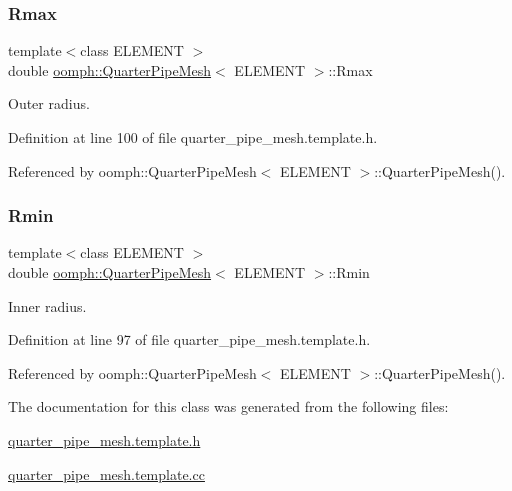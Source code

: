 \subsubsection{\texorpdfstring{Rmax}{Rmax}}
{\footnotesize\ttfamily template$<$class E\+L\+E\+M\+E\+NT $>$ \\
double \hyperlink{classoomph_1_1QuarterPipeMesh}{oomph\+::\+Quarter\+Pipe\+Mesh}$<$ E\+L\+E\+M\+E\+NT $>$\+::Rmax\hspace{0.3cm}{\ttfamily [protected]}}



Outer radius. 



Definition at line 100 of file quarter\+\_\+pipe\+\_\+mesh.\+template.\+h.



Referenced by oomph\+::\+Quarter\+Pipe\+Mesh$<$ E\+L\+E\+M\+E\+N\+T $>$\+::\+Quarter\+Pipe\+Mesh().

\mbox{\label{classoomph_1_1QuarterPipeMesh_aa75ba32bf5f825254f1e92a00109af3e}} 
\subsubsection{\texorpdfstring{Rmin}{Rmin}}
{\footnotesize\ttfamily template$<$class E\+L\+E\+M\+E\+NT $>$ \\
double \hyperlink{classoomph_1_1QuarterPipeMesh}{oomph\+::\+Quarter\+Pipe\+Mesh}$<$ E\+L\+E\+M\+E\+NT $>$\+::Rmin\hspace{0.3cm}{\ttfamily [protected]}}



Inner radius. 



Definition at line 97 of file quarter\+\_\+pipe\+\_\+mesh.\+template.\+h.



Referenced by oomph\+::\+Quarter\+Pipe\+Mesh$<$ E\+L\+E\+M\+E\+N\+T $>$\+::\+Quarter\+Pipe\+Mesh().



The documentation for this class was generated from the following files\+:\begin{DoxyCompactItemize}
\item 
\hyperlink{quarter__pipe__mesh_8template_8h}{quarter\+\_\+pipe\+\_\+mesh.\+template.\+h}\item 
\hyperlink{quarter__pipe__mesh_8template_8cc}{quarter\+\_\+pipe\+\_\+mesh.\+template.\+cc}\end{DoxyCompactItemize}
